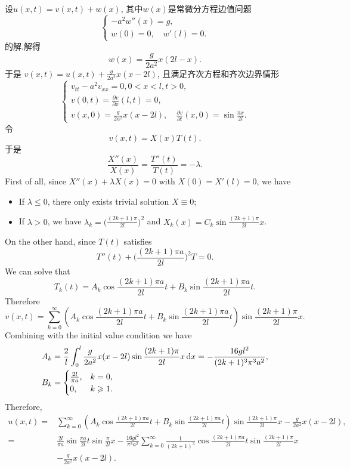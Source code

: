 \begin{solve}
	设$u(x,t)=v(x,t)+w(x)$, 其中$w(x)$是常微分方程边值问题
	\[\begin{cases}
		-a^2w''(x)=g, \\
		w(0)=0,\quad w'(l)=0.
	\end{cases}\]
	的解.解得
	$$w(x)=\frac{g}{2a^2}x(2l-x).$$
  于是 $\displaystyle v(x,t)=u(x,t)+\frac{g}{2a^2}x(x-2l)$, 且满足齐次方程和齐次边界情形
  \[\begin{cases}
    v_{tt}-a^2v_{xx}=0,0<x<l,t>0, \\
    v(0,t)=\frac{\partial v}{\partial x}(l,t)=0, \\
    v(x,0)=\frac{g}{2a^2}x(x-2l),\quad\frac{\partial v}{\partial t}(x,0)=\sin\frac{\pi x}{2l}.
  \end{cases}\]
  令
  \[ v(x,t) = X(x)T(t). \]
  于是
  \[ \frac{X''(x)}{X(x)} = \frac{T''(t)}{T(t)} = -\lambda. \]
  First of all, since $X''(x) + \lambda X(x) = 0$ with $X(0) = X'(l) = 0$, we have
  \begin{itemize}
    \item If $\lambda\leq 0$, there only exists trivial solution $X\equiv 0$;
    \item If $\lambda>0$, we have $\displaystyle \lambda_k = \bigl(\frac{(2k+1)\pi}{2l}\bigr)^2$
      and $\displaystyle X_k(x) = C_k \sin\frac{(2k+1)\pi}{2l}x$.
  \end{itemize}
  On the other hand, since $T(t)$ satisfies
  \[ T''(t) + \biggl(\frac{(2k+1)\pi a}{2l}\biggr)^2 T = 0. \]
  We can solve that
  \begin{equation}\label{eq:a12}
    T_k(t) = A_k \cos \frac{(2k+1)\pi a}{2l} t + B_k \sin \frac{(2k+1)\pi a}{2l} t.
  \end{equation}
  Therefore
  \begin{equation}\label{eq:a13}
    v(x,t) = \sum_{k=0}^\infty \left(A_k\cos\frac{(2k+1)\pi a}{2l}t+B_k\sin\frac{(2k+1)\pi a}{2l}t\right)\sin\frac{(2k+1)\pi}{2l}x.
  \end{equation}
  Combining with the initial value condition we have
  \begin{equation}\label{eq:a14}
    \begin{aligned}
      &A_k=\frac{2}{l}\int_0^l\frac{g}{2a^2}x(x-2l)\sin\frac{(2k+1)\pi}{2l}x\mathop{}\!\mathrm{d} x=-\frac{16gl^2}{(2k+1)^3\pi^3a^2}, \\
      &B_k=\begin{cases}\frac{2l}{\pi a},&k=0,\\0,&k\geqslant1.\end{cases}
    \end{aligned}
  \end{equation}
  Therefore,
  \begin{align*}
    u(x,t)
    ={} & \sum_{k=0}^{\infty}\left(A_k\cos\frac{(2k+1)\pi a}{2l}t+B_k\sin\frac{(2k+1)\pi a}{2l}t\right)\sin\frac{(2k+1)\pi}{2l}x - \frac{g}{2a^2}x(x-2l),\\
    ={} & \frac{2l}{\pi a}\sin\frac{\pi a}{2l}t\sin\frac{\pi}{2l}x-\frac{16gl^2}{\pi^3 a^2}\sum_{k=0}^{\infty}\frac{1}{(2k+1)^3}\cos\frac{(2k+1)\pi a}{2l}t\sin\frac{(2k+1)\pi}{2l}x \\
    &- \frac{g}{2a^2}x(x-2l).
  \end{align*}
\end{solve}


